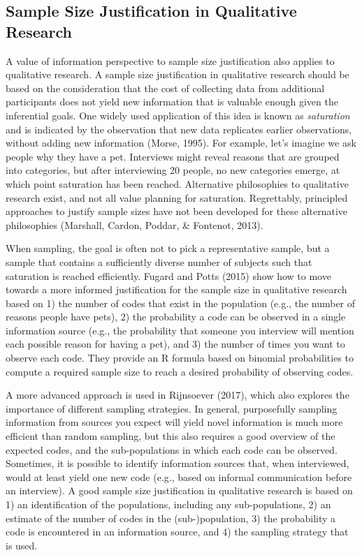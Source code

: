 \documentclass[
  english,
  ,jou, a4paper,floatsintext]{apa6}
\begin{document}
\hypertarget{sample-size-justification-in-qualitative-research}{%
\subsection{Sample Size Justification in Qualitative Research}\label{sample-size-justification-in-qualitative-research}}

A value of information perspective to sample size justification also applies to qualitative research. A sample size justification in qualitative research should be based on the consideration that the cost of collecting data from additional participants does not yield new information that is valuable enough given the inferential goals. One widely used application of this idea is known as \emph{saturation} and is indicated by the observation that new data replicates earlier observations, without adding new information (Morse, 1995). For example, let's imagine we ask people why they have a pet. Interviews might reveal reasons that are grouped into categories, but after interviewing 20 people, no new categories emerge, at which point saturation has been reached. Alternative philosophies to qualitative research exist, and not all value planning for saturation. Regrettably, principled approaches to justify sample sizes have not been developed for these alternative philosophies (Marshall, Cardon, Poddar, \& Fontenot, 2013).

When sampling, the goal is often not to pick a representative sample, but a sample that contains a sufficiently diverse number of subjects such that saturation is reached efficiently. Fugard and Potts (2015) show how to move towards a more informed justification for the sample size in qualitative research based on 1) the number of codes that exist in the population (e.g., the number of reasons people have pets), 2) the probability a code can be observed in a single information source (e.g., the probability that someone you interview will mention each possible reason for having a pet), and 3) the number of times you want to observe each code. They provide an R formula based on binomial probabilities to compute a required sample size to reach a desired probability of observing codes.

A more advanced approach is used in Rijnsoever (2017), which also explores the importance of different sampling strategies. In general, purposefully sampling information from sources you expect will yield novel information is much more efficient than random sampling, but this also requires a good overview of the expected codes, and the sub-populations in which each code can be observed. Sometimes, it is possible to identify information sources that, when interviewed, would at least yield one new code (e.g., based on informal communication before an interview). A good sample size justification in qualitative research is based on 1) an identification of the populations, including any sub-populations, 2) an estimate of the number of codes in the (sub-)population, 3) the probability a code is encountered in an information source, and 4) the sampling strategy that is used.
\end{document}

